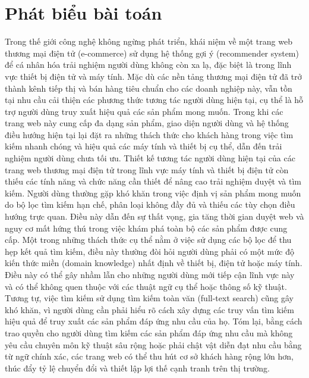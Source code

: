 \section{Phát biểu bài toán}
Trong thế giới công nghệ không ngừng phát triển, khái niệm về một trang web thương mại điện tử (e-commerce) sử dụng hệ thống gợi ý (recommender system) để cá nhân hóa trải nghiệm người dùng không còn xa lạ, đặc biệt là trong lĩnh vực thiết bị điện tử và máy tính. Mặc dù các nền tảng thương mại điện tử đã trở thành kênh tiếp thị và bán hàng tiêu chuẩn cho các doanh nghiệp này, vẫn tồn tại nhu cầu cải thiện các phương thức tương tác người dùng hiện tại, cụ thể là hỗ trợ người dùng truy xuất hiệu quả các sản phẩm mong muốn. Trong khi các trang web này cung cấp đa dạng sản phẩm, giao diện người dùng và hệ thống điều hướng hiện tại lại đặt ra những thách thức cho khách hàng trong việc tìm kiếm nhanh chóng và hiệu quả các máy tính và thiết bị cụ thể, dẫn đến trải nghiệm người dùng chưa tối ưu.
\newline
\newline
Thiết kế tương tác người dùng hiện tại của các trang web thương mại điện tử trong lĩnh vực máy tính và thiết bị điện tử còn thiếu các tính năng và chức năng cần thiết để nâng cao trải nghiệm duyệt và tìm kiếm. Người dùng thường gặp khó khăn trong việc định vị sản phẩm mong muốn do bộ lọc tìm kiếm hạn chế, phân loại không đầy đủ và thiếu các tùy chọn điều hướng trực quan. Điều này dẫn đến sự thất vọng, gia tăng thời gian duyệt web và nguy cơ mất hứng thú trong việc khám phá toàn bộ các sản phẩm được cung cấp.
\newline
\newline
Một trong những thách thức cụ thể nằm ở việc sử dụng các bộ lọc để thu hẹp kết quả tìm kiếm, điều này thường đòi hỏi người dùng phải có một mức độ kiến thức miền (domain knowledge) nhất định về thiết bị, điện tử hoặc máy tính. Điều này có thể gây nhầm lẫn cho những người dùng mới tiếp cận lĩnh vực này và có thể không quen thuộc với các thuật ngữ cụ thể hoặc thông số kỹ thuật. Tương tự, việc tìm kiếm sử dụng tìm kiếm toàn văn (full-text search) cũng gây khó khăn, vì người dùng cần phải hiểu rõ cách xây dựng các truy vấn tìm kiếm hiệu quả để truy xuất các sản phẩm đáp ứng nhu cầu của họ.
\newline
\newline
Tóm lại, bằng cách trao quyền cho người dùng tìm kiếm các sản phẩm đáp ứng nhu cầu mà không yêu cầu chuyên môn kỹ thuật sâu rộng hoặc phải chật vật diễn đạt nhu cầu bằng từ ngữ chính xác, các trang web có thể thu hút cơ sở khách hàng rộng lớn hơn, thúc đẩy tỷ lệ chuyển đổi và thiết lập lợi thế cạnh tranh trên thị trường.